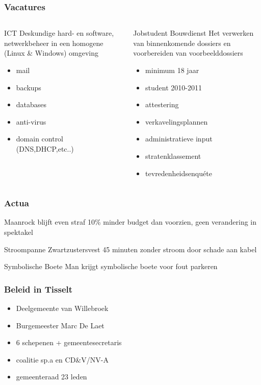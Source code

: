 \documentclass{beamer}
\begin{document}
\begin{frame}
\frametitle{Vacatures}
\begin{columns}
\begin{block}{ICT Deskundige}
hard- en software, netwerkbeheer in een homogene (Linux \& Windows) omgeving
\begin{itemize}
\item mail
\item backups
\item databases
\item anti-virus
\item domain control (DNS,DHCP,etc..)
\end{itemize}
\end{block}
\pause
{}
\begin{block}{Jobstudent Bouwdienst}
Het verwerken van binnenkomende dossiers en voorbereiden van voorbeelddossiers
\begin{itemize}
\item minimum 18 jaar
\item student 2010-2011
\item attestering
\item verkavelingsplannen
\item administratieve input
\item stratenklassement
\item tevredenheidsenqu\'{e}te
\end{itemize}
\end{block}
\end{columns}
\end{frame}


\begin{frame}
\frametitle{Actua}
\begin{block}{Maanrock blijft even straf}
10\% minder budget dan voorzien, geen verandering in spektakel
\end{block}
\begin{block}{Stroompanne}
Zwartzustersvest 45 minuten zonder stroom door schade aan kabel
\end{block}
\begin{block}{Symbolische Boete}
Man krijgt symbolische boete voor fout parkeren
\end{block}
\end{frame}


\begin{frame}
\frametitle{Beleid in Tisselt}
\begin{block}{}
\begin{itemize}
\item Deelgemeente van Willebroek
\item Burgemeester Marc De Laet
\item 6 schepenen + gemeentesecretaris
\item coalitie sp.a en CD\&V/NV-A
\item gemeenteraad 23 leden
\end{itemize}
\end{block}
\end{frame}
\end{document}
